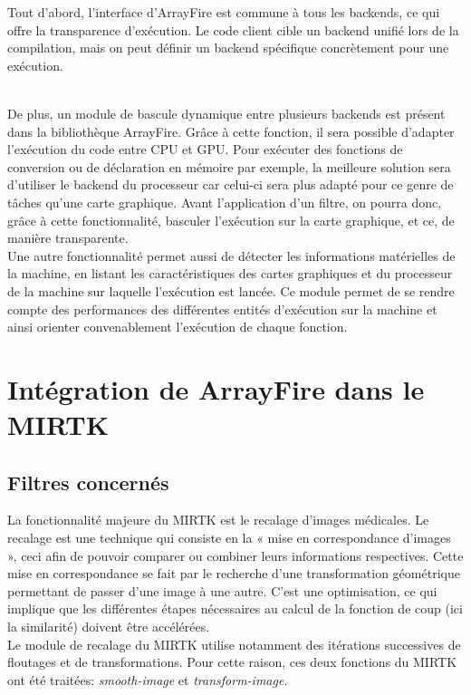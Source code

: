 \documentclass[10pt]{report}
\begin{document}
	Tout d'abord, l'interface d'ArrayFire est commune à tous les backends, ce qui offre la transparence d'exécution. Le code client cible un backend unifié lors de la compilation, mais on peut définir un backend spécifique concrètement pour une exécution.\\ ~\par

	De plus, un module de bascule dynamique entre plusieurs backends est présent dans la bibliothèque ArrayFire. Grâce à cette fonction, il sera possible d'adapter l'exécution du code entre CPU et GPU. Pour exécuter des fonctions de conversion ou de déclaration en mémoire par exemple, la meilleure solution sera d'utiliser le backend du processeur car celui-ci sera plus adapté pour ce genre de tâches qu'une carte graphique. Avant l'application d'un filtre, on pourra donc, grâce à cette fonctionnalité, basculer l'exécution sur la carte graphique, et ce, de manière transparente.\\
	
	Une autre fonctionnalité permet aussi de détecter les informations matérielles de la machine, en listant les caractéristiques des cartes graphiques et du processeur de la machine sur laquelle l'exécution est lancée. Ce module permet de se rendre compte des performances des différentes entités d'exécution sur la machine et ainsi orienter convenablement l'exécution de chaque fonction.
	
	
	\section{Intégration de ArrayFire dans le MIRTK}
	\subsection{Filtres concernés}
	La fonctionnalité majeure du MIRTK est le recalage d'images médicales. Le recalage est une technique qui consiste en la « mise en correspondance d'images », ceci afin de pouvoir comparer ou combiner leurs informations respectives. Cette mise en correspondance se fait par le recherche d'une transformation géométrique permettant de passer d'une image à une autre. C'est une optimisation, ce qui implique que les différentes étapes nécessaires au calcul de la fonction de coup (ici la similarité) doivent être accélérées.\\
	Le module de recalage du MIRTK utilise notamment des itérations successives de floutages et de transformations. Pour cette raison, ces deux fonctions du MIRTK ont été traitées: \textit{smooth-image} et \textit{transform-image}.
\end{document}
